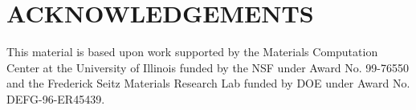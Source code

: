 \section{ACKNOWLEDGEMENTS}
This material is based upon work supported by the Materials
Computation Center at the University of Illinois funded by the NSF
under Award No. 99-76550 and the Frederick Seitz Materials
Research Lab funded by DOE under Award No. DEFG-96-ER45439.
